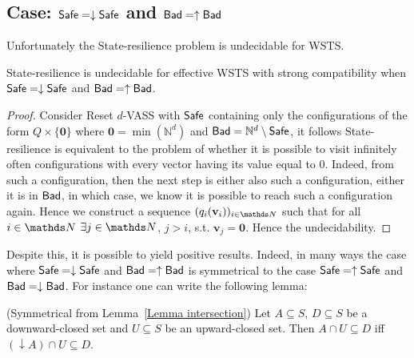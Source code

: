 \subsection{Case: $\textsf{Safe} = \downarrow \textsf{Safe}$ and $\textsf{Bad} = \uparrow \textsf{Bad}$}



Unfortunately the {\sc State-resilience} problem is undecidable for WSTS.

\begin{theorem}\label{srp down up}
{\sc State-resilience} is undecidable for effective WSTS with  strong  compatibility 
when
$\textsf{Safe}=\downarrow \textsf{Safe}$
and $\textsf{Bad}=\uparrow \textsf{Bad}$.
\end{theorem}

\begin{proof}
Consider Reset $d$-VASS
with $\textsf{Safe}$ %
	containing only the
		configurations of the form $Q \times \{ \textbf{0} \}$
	where $\textbf{0} = \min(\mathbb{N}^d)$ %
and $\textsf{Bad} = \mathbb{N}^d \setminus \textsf{Safe}$, 
it follows
{\sc State-resilience} 
is equivalent 
to the problem of whether 
it is possible to visit infinitely often configurations with every vector having its value equal to $0$.
Indeed, from such a configuration, then the next step is either also such a configuration, either it is in $\textsf{Bad}$, in which case, we know it is possible to reach such a configuration again. Hence we construct a sequence 
$(q_i ({\textbf{v}_{i}}) )_{i\in\N}$ 
such that for all $i\in\N$ 
$\exists j \in \N$, $j>i$, s.t. ${\textbf{v}_j} = \textbf{0}$.
Hence the undecidability.
\end{proof}


Despite this, it is possible to yield positive results. Indeed, in many ways the case where $\textsf{Safe} = \downarrow \textsf{Safe}$ and $\textsf{Bad} = \uparrow \textsf{Bad}$
is symmetrical to the case $\textsf{Safe} = \uparrow \textsf{Safe}$ and $\textsf{Bad} = \downarrow \textsf{Bad}$.
%
For instance one can write the following lemma:

\begin{lemma}(Symmetrical from Lemma~\ref{Lemma intersection})\label{Lemma intersection 2}
Let $A \subseteq S$, $D \subseteq S$ be a downward-closed set and $U \subseteq S$ be an upward-closed set. 
Then $A \cap U \subseteq D$  iff $ (\downarrow  A) \cap U \subseteq D$.
\end{lemma}

